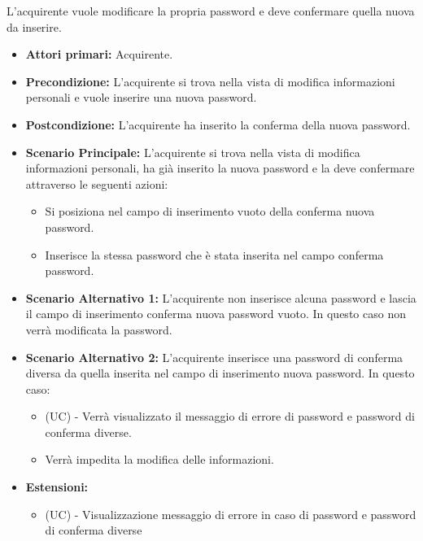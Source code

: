 L'acquirente vuole modificare la propria password e deve confermare quella nuova da inserire.
\begin{itemize}
    \item \textbf{Attori primari:} Acquirente.
    \item \textbf{Precondizione:} L'acquirente si trova nella vista di modifica informazioni personali e vuole inserire una nuova password.
    \item \textbf{Postcondizione:} L'acquirente ha inserito la conferma della nuova password.
    \item \textbf{Scenario Principale:} L'acquirente si trova nella vista di modifica informazioni personali, ha già inserito la nuova password e la deve confermare attraverso le seguenti azioni:
        \begin{itemize}
            \item Si posiziona nel campo di inserimento vuoto della conferma nuova password.
            \item Inserisce la stessa password che è stata inserita nel campo conferma password.
        \end{itemize}
    \item \textbf{Scenario Alternativo 1:} L'acquirente non inserisce alcuna password e lascia il campo di inserimento conferma nuova password vuoto. In questo caso non verrà modificata la password.
    \item \textbf{Scenario Alternativo 2:} L'acquirente inserisce una password di conferma diversa da quella inserita nel campo di inserimento nuova password. In questo caso:
    \begin{itemize}
        \item (UC) - Verrà visualizzato il messaggio di errore di password e password di conferma diverse.
        \item Verrà impedita la modifica delle informazioni.
    \end{itemize}
    \item \textbf{Estensioni:}
    \begin{itemize}
        \item (UC) - Visualizzazione messaggio di errore in caso di password e password di conferma diverse
    \end{itemize}
\end{itemize}




